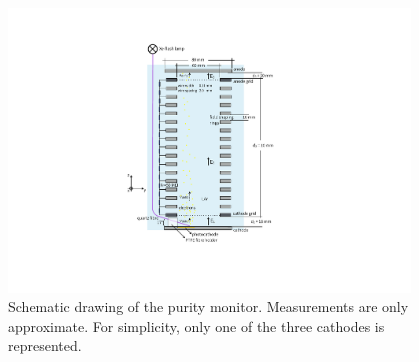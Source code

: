 \documentclass[a4paper,11pt]{article}
\begin{document}
\begin{figure}[t]
	\begin{center}
	\includegraphics[width=0.95\textwidth, trim={6cm 4.5cm 7cm 2cm}, clip=true]{figures/schematic_purity_monitor.pdf}			
	\caption[]{Schematic drawing of the purity monitor. Measurements are only approximate. For simplicity, only one of the three cathodes is represented.}
	\label{fig:schematic_PM}
	\end{center}	
\end{figure}
\end{document}
